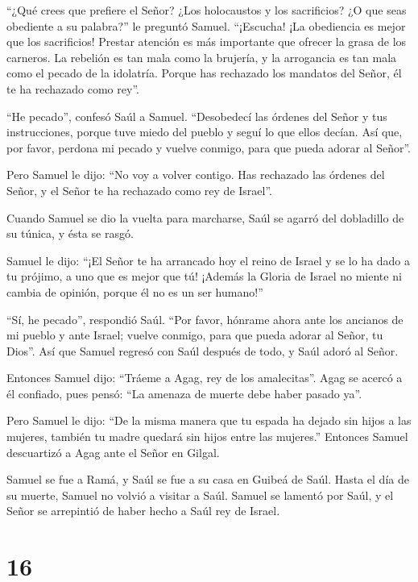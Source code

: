  ``¿Qué crees que prefiere el Señor? ¿Los holocaustos y los
sacrificios? ¿O que seas obediente a su palabra?'' le preguntó Samuel.
``¡Escucha! ¡La obediencia es mejor que los sacrificios! Prestar
atención es más importante que ofrecer la grasa de los carneros.
 La rebelión es tan mala como la brujería, y la arrogancia
es tan mala como el pecado de la idolatría. Porque has rechazado los
mandatos del Señor, él te ha rechazado como rey''.

 ``He pecado'', confesó Saúl a Samuel. ``Desobedecí las
órdenes del Señor y tus instrucciones, porque tuve miedo del pueblo y
seguí lo que ellos decían.  Así que, por favor, perdona mi
pecado y vuelve conmigo, para que pueda adorar al Señor''.

 Pero Samuel le dijo: ``No voy a volver contigo. Has
rechazado las órdenes del Señor, y el Señor te ha rechazado como rey de
Israel''.

 Cuando Samuel se dio la vuelta para marcharse, Saúl se
agarró del dobladillo de su túnica, y ésta se rasgó.

 Samuel le dijo: ``¡El Señor te ha arrancado hoy el reino
de Israel y se lo ha dado a tu prójimo, a uno que es mejor que tú!
 ¡Además la Gloria de Israel no miente ni cambia de
opinión, porque él no es un ser humano!''

 ``Sí, he pecado'', respondió Saúl. ``Por favor, hónrame
ahora ante los ancianos de mi pueblo y ante Israel; vuelve conmigo, para
que pueda adorar al Señor, tu Dios''.  Así que Samuel
regresó con Saúl después de todo, y Saúl adoró al Señor.

 Entonces Samuel dijo: ``Tráeme a Agag, rey de los
amalecitas''. Agag se acercó a él confiado, pues pensó: ``La amenaza de
muerte debe haber pasado ya''.

 Pero Samuel le dijo: ``De la misma manera que tu espada ha
dejado sin hijos a las mujeres, también tu madre quedará sin hijos entre
las mujeres.'' Entonces Samuel descuartizó a Agag ante el Señor en
Gilgal.

 Samuel se fue a Ramá, y Saúl se fue a su casa en Guibeá de
Saúl.  Hasta el día de su muerte, Samuel no volvió a
visitar a Saúl. Samuel se lamentó por Saúl, y el Señor se arrepintió de
haber hecho a Saúl rey de Israel.

\hypertarget{section-15}{%
\section{16}\label{section-15}}

